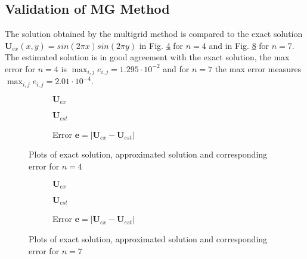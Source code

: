 \documentclass[11pt,a4paper]{article}
\newcommand{\refFig}[1]{Fig. \ref{#1}}
\begin{document}
\subsection{Validation of MG Method}
The solution obtained by the multigrid method is compared to the exact solution $\mathbf{U}_{ex}(x,y) = sin(2\pi x)sin(2 \pi y)$ in \refFig{fig::Val4} for $n=4$ and in \refFig{fig::Val7} for $n=7$. The estimated solution is in good agreement with the exact solution, the max error for $n=4$ is $\max_{i,j} e_{i,j} = 1.295 \cdot 10^{-2}$ and for $n=7$ the max error measures $\max_{i,j} e_{i,j} = 2.01 \cdot 10^{-4}$. 
%
\begin{figure}[h!]
	\centering
	\begin{subfigure}[h!]{.3\textwidth}
			\centering
			\resizebox{0.4\width}{!}{}
			\caption{$\mathbf{U}_{ex}$}
			\label{fig::Uex4}
	\end{subfigure}
	\hfill
	\begin{subfigure}[h!]{.3\textwidth}
		\centering
		\resizebox{0.4\width}{!}{}
		\caption{$\mathbf{U}_{est}$}
		\label{fig::Uest4}
	\end{subfigure}
	\hfill
	\begin{subfigure}[h!]{.3\textwidth}
		\centering
		\resizebox{0.4\width}{!}{}
		\caption{Error $\mathbf{e} = |\mathbf{U}_{ex} - \mathbf{U}_{est}|$}
		\label{fig::Error4}
	\end{subfigure}
	\caption{Plots of exact solution, approximated solution and corresponding error for $n=4$ }
	\label{fig::Val4}
\end{figure}
%
\begin{figure}[h!]
	\centering
	\begin{subfigure}[h!]{.3\textwidth}
		\centering
		\resizebox{0.4\width}{!}{}
		\caption{$\mathbf{U}_{ex}$}
		\label{fig::Uex7}
	\end{subfigure}
	\hfill
	\begin{subfigure}[h!]{.3\textwidth}
		\centering
		\resizebox{0.4\width}{!}{}
		\caption{$\mathbf{U}_{est}$}
		\label{fig::Uest7}
	\end{subfigure}
	\hfill
	\begin{subfigure}[h!]{.3\textwidth}
		\centering
		\resizebox{0.4\width}{!}{}
		\caption{Error $\mathbf{e} = |\mathbf{U}_{ex} - \mathbf{U}_{est}|$}
		\label{fig::Error7}
	\end{subfigure}
	\caption{Plots of exact solution, approximated solution and corresponding error for $n=7$ }
	\label{fig::Val7}
\end{figure}
%
\newpage
\end{document}
